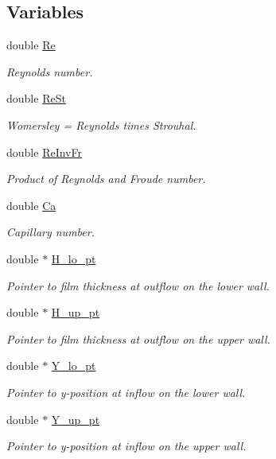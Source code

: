 \subsection*{Variables}
\begin{DoxyCompactItemize}
\item 
double \hyperlink{namespaceGlobal__Physical__Variables_ab814e627d2eb5bc50318879d19ab16b9}{Re}
\begin{DoxyCompactList}\small\item\em Reynolds number. \end{DoxyCompactList}\item 
double \hyperlink{namespaceGlobal__Physical__Variables_a085ee4bf968ffdd01a41b8c41864f907}{Re\+St}
\begin{DoxyCompactList}\small\item\em Womersley = Reynolds times Strouhal. \end{DoxyCompactList}\item 
double \hyperlink{namespaceGlobal__Physical__Variables_aa6286f02b476912dd7550eced538331a}{Re\+Inv\+Fr}
\begin{DoxyCompactList}\small\item\em Product of Reynolds and Froude number. \end{DoxyCompactList}\item 
double \hyperlink{namespaceGlobal__Physical__Variables_a8b32b93d2e546f9375ec418474107838}{Ca}
\begin{DoxyCompactList}\small\item\em Capillary number. \end{DoxyCompactList}\item 
double $\ast$ \hyperlink{namespaceGlobal__Physical__Variables_a137bdac2ad4b72a03ec9916e8ee7395b}{H\+\_\+lo\+\_\+pt}
\begin{DoxyCompactList}\small\item\em Pointer to film thickness at outflow on the lower wall. \end{DoxyCompactList}\item 
double $\ast$ \hyperlink{namespaceGlobal__Physical__Variables_a83a3a82f89784013805bd23d63faa7e3}{H\+\_\+up\+\_\+pt}
\begin{DoxyCompactList}\small\item\em Pointer to film thickness at outflow on the upper wall. \end{DoxyCompactList}\item 
double $\ast$ \hyperlink{namespaceGlobal__Physical__Variables_a84caa2a64e50ba5b390a3cd100f0f835}{Y\+\_\+lo\+\_\+pt}
\begin{DoxyCompactList}\small\item\em Pointer to y-\/position at inflow on the lower wall. \end{DoxyCompactList}\item 
double $\ast$ \hyperlink{namespaceGlobal__Physical__Variables_a75878a0c79c88065fd9031f273b62698}{Y\+\_\+up\+\_\+pt}
\begin{DoxyCompactList}\small\item\em Pointer to y-\/position at inflow on the upper wall. \end{DoxyCompactList}\end{DoxyCompactItemize}


